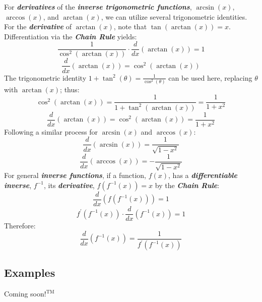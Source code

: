 For \textbf{\textit{derivatives}} of the \textbf{\textit{inverse trigonometric functions}}, $\arcsin(x)$, $\arccos(x)$, and $\arctan(x)$, we can utilize several trigonometric identities. For the \textbf{\textit{derivative}} of $\arctan(x)$, note that $\tan(\arctan(x)) = x$. Differentiation via the \textbf{\textit{Chain Rule}} yields:
%
\begin{equation}
\frac{1}{\cos^2(\arctan(x))} \cdot \frac{d}{dx}\left(\arctan(x)\right) = 1
\end{equation}
%
\begin{equation}
\frac{d}{dx}\left(\arctan(x)\right) = \cos^2(\arctan(x))
\end{equation}
%
The trigonometric identity $1 + \tan^2(\theta) = \frac{1}{\cos^2(\theta)}$ can be used here, replacing $\theta$ with $\arctan(x)$; thus:
%
\begin{equation}
\cos^2(\arctan(x)) = \frac{1}{1 + \tan^2(\arctan(x))} = \frac{1}{1 + x^2}
\end{equation}
%
\begin{equation}
\frac{d}{dx}\left(\arctan(x)\right) = \cos^2(\arctan(x)) = \frac{1}{1 + x^2}
\end{equation}
%
Following a similar process for $\arcsin(x)$ and $\arccos(x)$:
%
\begin{equation}
\frac{d}{dx}\left(\arcsin(x)\right) = \frac{1}{\sqrt{1-x^2}}
\end{equation}
%
\begin{equation}
\frac{d}{dx}\left(\arccos(x)\right) = -\frac{1}{\sqrt{1-x^2}}
\end{equation}
%
For general \textbf{\textit{inverse functions}}, if a function, $f(x)$, has a \textbf{\textit{differentiable inverse}}, $f^{-1}$, its \textbf{\textit{derivative}}, $f\left(f^{-1}(x)\right) = x$ by the \textbf{\textit{Chain Rule}}:
%
\begin{equation}
\frac{d}{dx}\left(f\left(f^{-1}\left(x\right)\right)\right) = 1
\end{equation}
%
\begin{equation}
f^\prime\left(f^{-1}\left(x\right)\right) \cdot \frac{d}{dx}\left(f^{-1}\left(x\right)\right) = 1
\end{equation}
%
Therefore:
%
\begin{equation}
\frac{d}{dx}\left(f^{-1}\left(x\right)\right) = \frac{1}{f^\prime\left(f^{-1}\left(x\right)\right)}
\end{equation}
%

\begin{center}
\section*{\small Examples}
Coming soon$!^{\text{TM}}$
\end{center}

